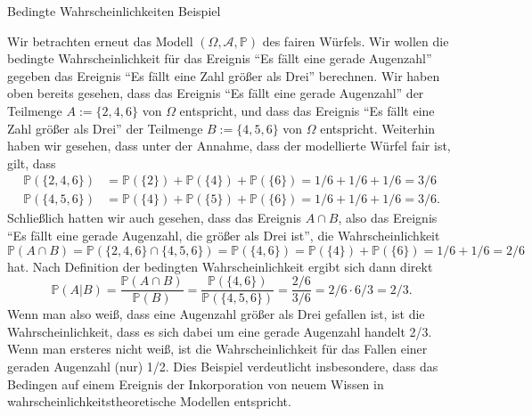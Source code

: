 \documentclass[
  8pt,
  ignorenonframetext,
]{beamer}
\begin{document}
\begin{frame}{Bedingte Wahrscheinlichkeiten}
\protect\hypertarget{bedingte-wahrscheinlichkeiten-2}{}
Beispiel \footnotesize {}

Wir betrachten erneut das Modell \((\Omega, \mathcal{A}, \mathbb{P})\)
des fairen Würfels. Wir wollen die bedingte Wahrscheinlichkeit für das
Ereignis ``Es fällt eine gerade Augenzahl'' gegeben das Ereignis ``Es
fällt eine Zahl größer als Drei'' berechnen. Wir haben oben bereits
gesehen, dass das Ereignis ``Es fällt eine gerade Augenzahl'' der
Teilmenge \(A := \{2,4,6\}\) von \(\Omega\) entspricht, und dass das
Ereignis ``Es fällt eine Zahl größer als Drei'' der Teilmenge
\(B := \{4,5,6\}\) von \(\Omega\) entspricht. Weiterhin haben wir
gesehen, dass unter der Annahme, dass der modellierte Würfel fair ist,
gilt, dass \begin{align}
\mathbb{P}(\{2,4,6\})
& = \mathbb{P}(\{2\}) + \mathbb{P}(\{4\}) + \mathbb{P}(\{6\})
= 1/6 + 1/6 + 1/6 = 3/6   \\
\mathbb{P}(\{4,5,6\})
& = \mathbb{P}(\{4\}) + \mathbb{P}(\{5\}) + \mathbb{P}(\{6\})
= 1/6 + 1/6 + 1/6 = 3/6.
\end{align} Schließlich hatten wir auch gesehen, dass das Ereignis
\(A \cap B\), also das Ereignis ``Es fällt eine gerade Augenzahl, die
größer als Drei ist'', die Wahrscheinlichkeit \begin{equation}
\mathbb{P}(A \cap B) = \mathbb{P}(\{2,4,6\} \cap \{4,5,6\}) = \mathbb{P}(\{4,6\})
= \mathbb{P}(\{4\}) + \mathbb{P}(\{6\}) = 1/6 + 1/6 = 2/6
\end{equation} hat. Nach Definition der bedingten Wahrscheinlichkeit
ergibt sich dann direkt \begin{equation}
\mathbb{P}(A|B)
= \frac{\mathbb{P}(A \cap B)}{\mathbb{P}(B)}
= \frac{\mathbb{P}(\{4,6\})}{\mathbb{P}(\{4,5,6\})}
= \frac{2/6}{3/6}
= 2/6 \cdot 6/3
= 2/3.
\end{equation} Wenn man also weiß, dass eine Augenzahl größer als Drei
gefallen ist, ist die Wahrscheinlichkeit, dass es sich dabei um eine
gerade Augenzahl handelt 2/3. Wenn man ersteres nicht weiß, ist die
Wahrscheinlichkeit für das Fallen einer geraden Augenzahl (nur) 1/2.
Dies Beispiel verdeutlicht insbesondere, dass das Bedingen auf einem
Ereignis der Inkorporation von neuem Wissen in
wahrscheinlichkeitstheoretische Modellen entspricht.
\end{frame}
\end{document}
